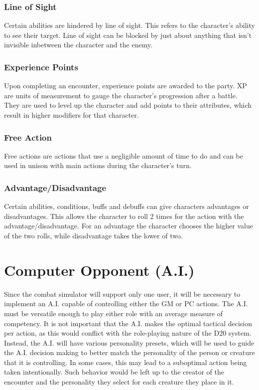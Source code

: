 \documentclass[12pt,a4paper]{report}
\begin{document}
			\subsubsection{Line of Sight}
				Certain abilities are hindered by line of sight. This refers to the character's ability to see their target. Line of sight can be blocked by just about anything that isn't invisible inbetween the character and the enemy.
			\subsubsection{Experience Points}
				Upon completing an encounter, experience points are awarded to the party. XP are units of measurement to gauge the character's progression after a battle. They are used to level up the character and add points to their attributes, which result in higher modifiers for that character.
			\subsubsection{Free Action}
				Free actions are actions that use a negligible amount of time to do and can be used in unison with main actions during the character's turn.
			\subsubsection{Advantage/Disadvantage}
				Certain abilities, conditions, buffs and debuffs can give characters advantages or disadvantages. This allows the character to roll 2 times for the action with the advantage/disadvantage. For an advantage the character chooses the higher value of the two rolls, while disadvantage takes the lower of two.
\section{Computer Opponent (A.I.)}
	Since the combat simulator will support only one user, it will be necessary to implement an A.I. capable of controlling either the GM or PC actions. The A.I. must be versatile enough to play either role with an average measure of competency. It is not important that the A.I. makes the optimal tactical decision per action, as this would conflict with the role-playing nature of the D20 system. Instead, the A.I. will have various personality presets, which will be used to guide the A.I. decision making to better match the personality of the person or creature that it is controlling. In some cases, this may lead to a suboptimal action being taken intentionally. Such behavior would be left up to the creator of the encounter and the personality they select for each creature they place in it.
	
\end{document}

